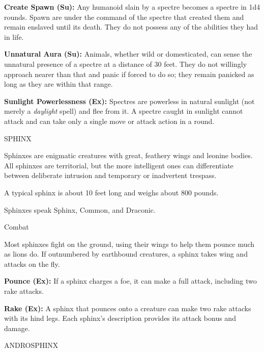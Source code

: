 \documentclass{article}
\begin{document}
\textbf{Create Spawn (Su):} Any humanoid slain by a spectre becomes a spectre in 
1d4 rounds. Spawn are under the command of the spectre that created them and remain 
enslaved until its death. They do not possess any of the abilities they had in 
life.

\textbf{Unnatural Aura (Su):} Animals, whether wild or domesticated, can sense 
the unnatural presence of a spectre at a distance of 30 feet. They do not willingly 
approach nearer than that and panic if forced to do so; they remain panicked as 
long as they are within that range.

\textbf{Sunlight Powerlessness (Ex): }Spectres are powerless in natural sunlight 
(not merely a \textit{daylight }spell) and flee from it. A spectre caught in sunlight 
cannot attack and can take only a single move or attack action in a round.

\vspace{12pt}
{\LARGE{}SPHINX}

Sphinxes are enigmatic creatures with great, feathery wings and leonine bodies. 
All sphinxes are territorial, but the more intelligent ones can differentiate between 
deliberate intrusion and temporary or inadvertent trespass.

A typical sphinx is about 10 feet long and weighs about 800 pounds.

Sphinxes speak Sphinx, Common, and Draconic.

Combat

Most sphinxes fight on the ground, using their wings to help them pounce much as 
lions do. If outnumbered by earthbound creatures, a sphinx takes wing and attacks 
on the fly.

\textbf{Pounce (Ex):} If a sphinx charges a foe, it can make a full attack, including 
two rake attacks.

\textbf{Rake (Ex):} A sphinx that pounces onto a creature can make two rake attacks 
with its hind legs. Each sphinx's description provides its attack bonus and damage.

\vspace{12pt}
ANDROSPHINX
\end{document}
